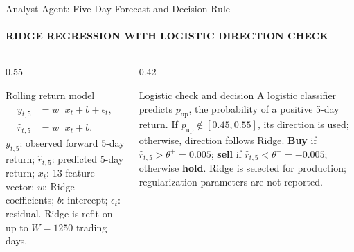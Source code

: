 \documentclass[aspectratio=169,11pt]{beamer}
\newcommand{\keyphrase}[1]{\textbf{\color{DELCONred}#1}}
\begin{document}
\begin{frame}{Analyst Agent: Five-Day Forecast and Decision Rule}
  \framesubtitle{RIDGE REGRESSION WITH LOGISTIC DIRECTION CHECK}
  \begin{columns}[T,onlytextwidth]
    \begin{column}{0.55\textwidth}
      \begin{block}{Rolling return model}
        \centering\small
        \begin{align*}
          y_{t,5}&=w^{\top}x_t+b+\epsilon_t,\\
          \hat r_{t,5}&=w^{\top}x_t+b.
        \end{align*}
        \scriptsize $y_{t,5}$: observed forward 5-day return; $\hat r_{t,5}$: predicted 5-day return; $x_t$: 13-feature vector; $w$: Ridge coefficients; $b$: intercept; $\epsilon_t$: residual. Ridge is refit on up to $W=1250$ trading days.
      \end{block}
    \end{column}
    \begin{column}{0.42\textwidth}
      \begin{alertblock}{Logistic check and decision}
        \scriptsize A logistic classifier predicts $p_{\mathrm{up}}$, the probability of a positive 5-day return. If $p_{\mathrm{up}}\notin[0.45,0.55]$, its direction is used; otherwise, direction follows Ridge. \keyphrase{Buy} if $\hat r_{t,5}>\theta^+=0.005$; \keyphrase{sell} if $\hat r_{t,5}<\theta^-=-0.005$; otherwise \keyphrase{hold}. Ridge is selected for production; regularization parameters are not reported.
      \end{alertblock}
    \end{column}
  \end{columns}
\end{frame}
\end{document}
